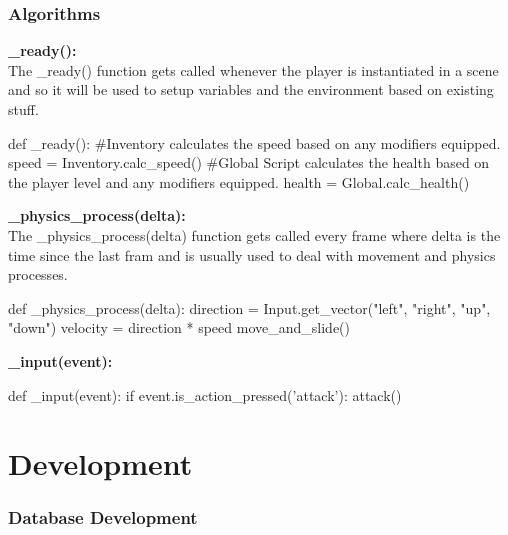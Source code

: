 \documentclass{article}
\begin{document}
        \subsubsection{Algorithms}
        \textbf{\_ready():}\\
        The \_ready() function gets called whenever the player is instantiated in a scene and so it will be used to setup variables and the environment based on existing stuff.\\
        \begin{python}
def _ready():
        #Inventory calculates the speed based on any modifiers equipped.
        speed = Inventory.calc_speed() 
        #Global Script calculates the health based on the player level and any modifiers equipped.
        health = Global.calc_health()
        \end{python}
        \textbf{\_physics\_process(delta):}\\
        The \_physics\_process(delta) function gets called every frame where delta is the time since the last fram and is usually used to deal with movement and physics processes.\\
        \begin{python}
def _physics_process(delta):
   direction = Input.get_vector("left", "right", "up", "down")
   velocity = direction * speed
   move_and_slide()
        \end{python}
        \textbf{\_input(event):}\\
        \begin{python}
def _input(event):
   if event.is_action_pressed('attack'):
      attack()
        \end{python}
\section{Development}
\subsubsection{Database Development}
\end{document}
